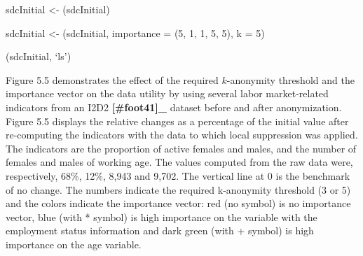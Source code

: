 \documentclass[letterpaper,10pt,english]{sphinxmanual}
\begin{document}
\begin{DUlineblock}{0em}
\item[] 
\item[] sdcInitial \textless{}- (sdcInitial)
\end{DUlineblock}

\begin{DUlineblock}{0em}
\item[] 
\item[] sdcInitial \textless{}- (sdcInitial, importance =
(5, 1, 1, 5, 5), k = 5)
\item[] (sdcInitial, ‘ls’)
\end{DUlineblock}


\begin{DUlineblock}{0em}
\item[] 
\item[] 
\item[] 
\item[] 
\item[] 
\end{DUlineblock}

Figure 5.5 demonstrates the effect of the required \(k\)-anonymity
threshold and the importance vector on the data utility by using several
labor market-related indicators from an I2D2 {\color{red}\bfseries{}{[}\#foot41{]}\_}
dataset before and after anonymization. Figure 5.5 displays the relative
changes as a percentage of the initial value after re-computing the
indicators with the data to which local suppression was applied. The
indicators are the proportion of active females and males, and the
number of females and males of working age. The values computed from the
raw data were, respectively, 68\%, 12\%, 8,943 and 9,702. The vertical
line at 0 is the benchmark of no change. The numbers indicate the
required k-anonymity threshold (3 or 5) and the colors indicate the
importance vector: red (no symbol) is no importance vector, blue (with
* symbol) is high importance on the variable with the employment status
information and dark green (with + symbol) is high importance on the age
variable.
\end{document}
